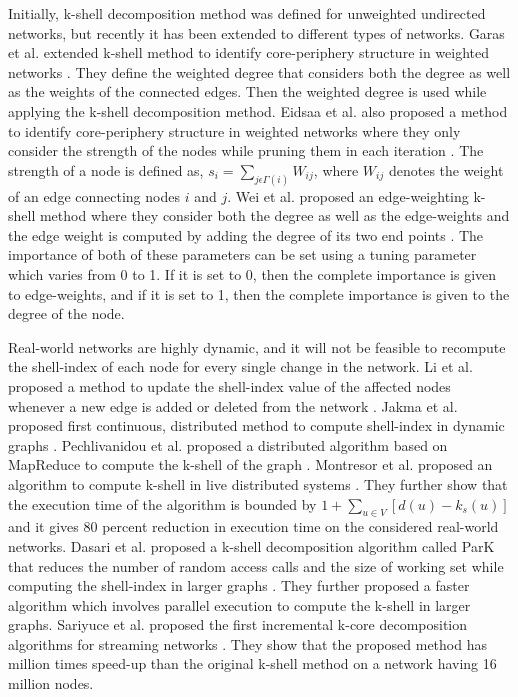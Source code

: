 \documentclass[12pt,3p]{article}
\begin{document}
Initially, k-shell decomposition method was defined for unweighted undirected networks, but recently it has been extended to different types of networks. Garas et al. extended k-shell method to identify core-periphery structure in weighted networks \cite{garas2012k}. They define the weighted degree that considers both the degree as well as the weights of the connected edges. Then the weighted degree is used while applying the k-shell decomposition method. Eidsaa et al. also proposed a method to identify core-periphery structure in weighted networks where they only consider the strength of the nodes while pruning them in each iteration \cite{eidsaa2013s}. The strength of a node is defined as, $s_i=\sum_{j \epsilon \Gamma (i)} W_{ij}$, where $W_{ij}$ denotes the weight of an edge connecting nodes $i$ and $j$. Wei et al. proposed an edge-weighting k-shell method where they consider both the degree as well as the edge-weights and the edge weight is computed by adding the degree of its two end points \cite{wei2015weighted}. The importance of both of these parameters can be set using a tuning parameter which varies from 0 to 1. If it is set to 0, then the complete importance is given to edge-weights, and if it is set to 1, then the complete importance is given to the degree of the node.

Real-world networks are highly dynamic, and it will not be feasible to recompute the shell-index of each node for every single change in the network. Li et al. proposed a method to update the shell-index value of the affected nodes whenever a new edge is added or deleted from the network \cite{li2014efficient}. Jakma et al. proposed first continuous, distributed method to compute shell-index in dynamic graphs \cite{jakma2012distributed}. Pechlivanidou et al. proposed a distributed algorithm based on MapReduce to compute the k-shell of the graph \cite{pechlivanidou2014mapreduce}. Montresor et al. proposed an algorithm to compute k-shell in live distributed systems \cite{montresor2013distributed}. They further show that the execution time of the algorithm is bounded by $1+\sum_{u \in V}[d(u)-k_s(u)]$ and it gives 80 percent reduction in execution time on the considered real-world networks. Dasari et al. proposed a k-shell decomposition algorithm called ParK that reduces the number of random access calls and the size of working set while computing the shell-index in larger graphs \cite{dasari2014park}. They further proposed a faster algorithm which involves parallel execution to compute the k-shell in larger graphs. Sariyuce et al. proposed the first incremental k-core decomposition algorithms for streaming networks \cite{sariyuce2013streaming}. They show that the proposed method has million times speed-up than the original k-shell method on a network having 16 million nodes.
\end{document}
